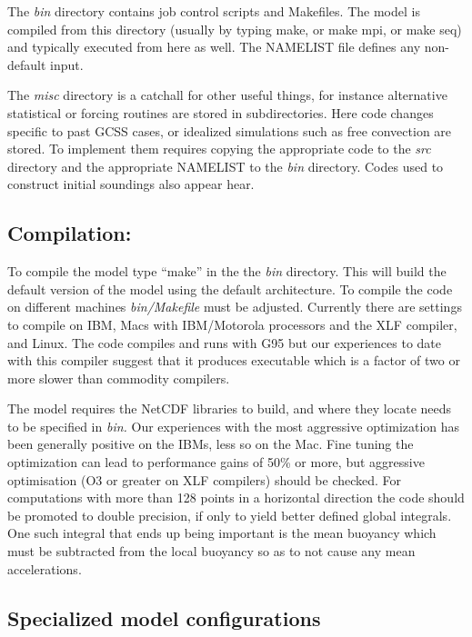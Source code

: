 \documentclass[11pt,a4paper]{article}
\begin{document}
The \emph{bin} directory contains job control scripts and Makefiles.
The model is compiled from this directory (usually by typing make, or
make mpi, or make seq) and typically executed from here as well.  The
NAMELIST file defines any non-default input.

The \emph{misc} directory is a catchall for other useful things, for
instance alternative statistical or forcing routines are stored in
subdirectories.  Here code changes specific to past GCSS cases, or
idealized simulations such as free convection are stored.  To
implement them requires copying the appropriate code to the \emph{src}
directory and the appropriate NAMELIST to the \emph{bin} directory.
Codes used to construct initial soundings also appear hear.

\subsection{Compilation:}

To compile the model type ``make'' in the the \emph{bin} directory.
This will build the default version of the model using the default
architecture.  To compile the code on different machines
\emph{bin/Makefile} must be adjusted.  Currently there are settings to
compile on IBM, Macs with IBM/Motorola processors and the XLF
compiler, and Linux.  The code compiles and runs with G95 but our
experiences to date with this compiler suggest that it produces
executable which is a factor of two or more slower than commodity
compilers.

The model requires the NetCDF libraries to build, and where they
locate needs to be specified in \emph{bin.}  Our experiences with the
most aggressive optimization has been generally positive on the IBMs,
less so on the Mac.  Fine tuning the optimization can lead to
performance gains of 50\% or more, but aggressive optimisation (O3 or
greater on XLF compilers) should be checked.  For computations with
more than 128 points in a horizontal direction the code should be
promoted to double precision, if only to yield better defined global
integrals.  One such integral that ends up being important is the mean
buoyancy which must be subtracted from the local buoyancy so as to not
cause any mean accelerations.

\subsection{Specialized model configurations}
\end{document}
